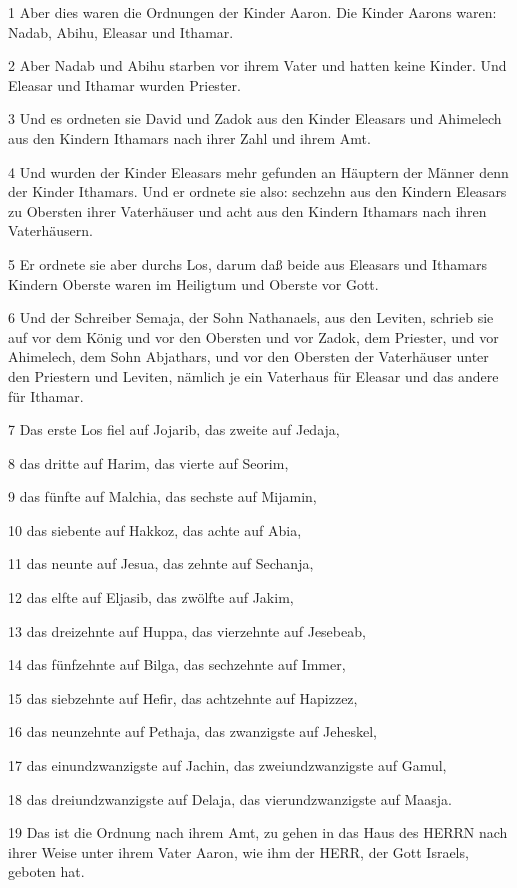 \par 1 Aber dies waren die Ordnungen der Kinder Aaron. Die Kinder Aarons waren: Nadab, Abihu, Eleasar und Ithamar.
\par 2 Aber Nadab und Abihu starben vor ihrem Vater und hatten keine Kinder. Und Eleasar und Ithamar wurden Priester.
\par 3 Und es ordneten sie David und Zadok aus den Kinder Eleasars und Ahimelech aus den Kindern Ithamars nach ihrer Zahl und ihrem Amt.
\par 4 Und wurden der Kinder Eleasars mehr gefunden an Häuptern der Männer denn der Kinder Ithamars. Und er ordnete sie also: sechzehn aus den Kindern Eleasars zu Obersten ihrer Vaterhäuser und acht aus den Kindern Ithamars nach ihren Vaterhäusern.
\par 5 Er ordnete sie aber durchs Los, darum daß beide aus Eleasars und Ithamars Kindern Oberste waren im Heiligtum und Oberste vor Gott.
\par 6 Und der Schreiber Semaja, der Sohn Nathanaels, aus den Leviten, schrieb sie auf vor dem König und vor den Obersten und vor Zadok, dem Priester, und vor Ahimelech, dem Sohn Abjathars, und vor den Obersten der Vaterhäuser unter den Priestern und Leviten, nämlich je ein Vaterhaus für Eleasar und das andere für Ithamar.
\par 7 Das erste Los fiel auf Jojarib, das zweite auf Jedaja,
\par 8 das dritte auf Harim, das vierte auf Seorim,
\par 9 das fünfte auf Malchia, das sechste auf Mijamin,
\par 10 das siebente auf Hakkoz, das achte auf Abia,
\par 11 das neunte auf Jesua, das zehnte auf Sechanja,
\par 12 das elfte auf Eljasib, das zwölfte auf Jakim,
\par 13 das dreizehnte auf Huppa, das vierzehnte auf Jesebeab,
\par 14 das fünfzehnte auf Bilga, das sechzehnte auf Immer,
\par 15 das siebzehnte auf Hefir, das achtzehnte auf Hapizzez,
\par 16 das neunzehnte auf Pethaja, das zwanzigste auf Jeheskel,
\par 17 das einundzwanzigste auf Jachin, das zweiundzwanzigste auf Gamul,
\par 18 das dreiundzwanzigste auf Delaja, das vierundzwanzigste auf Maasja.
\par 19 Das ist die Ordnung nach ihrem Amt, zu gehen in das Haus des HERRN nach ihrer Weise unter ihrem Vater Aaron, wie ihm der HERR, der Gott Israels, geboten hat.
